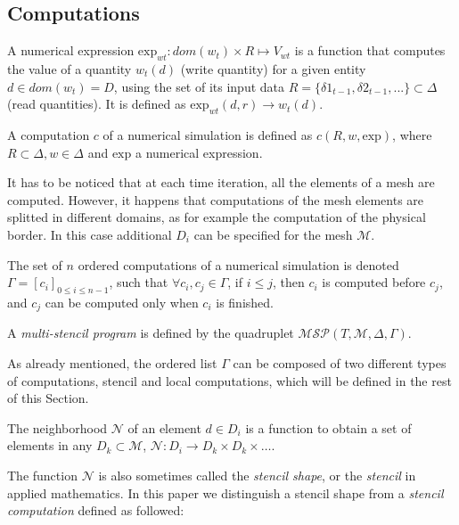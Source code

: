 \subsection{Computations}

\begin{mydef}
A numerical expression $\text{exp}_{wt}: dom(w_t)\times R\mapsto V_{wt}$ is a function that computes the value of a quantity $w_t(d)$ (write quantity) for a given entity $d \in dom(w_t)=D$, using the set of its input data $R=\{\delta 1_{t-1}, \delta 2_{t-1}, ...\} \subset \Delta$ (read quantities). It is defined as $\text{exp}_{wt}(d,r) \rightarrow w_t(d)$.
\end{mydef}


\begin{mydef}
A computation $c$ of a numerical simulation is defined as $c(R,w,\text{exp})$, where $R \subset \Delta, w \in \Delta$ and $\text{exp}$ a numerical expression. %
\end{mydef}
It has to be noticed that at each time iteration, all the elements of a mesh are computed. However, it happens that computations of the mesh elements are splitted in different domains, as for example the computation of the physical border. In this case additional $D_i$ can be specified for the mesh $\mathcal{M}$.

\begin{mydef}
The set of $n$ ordered computations of a numerical simulation is denoted $\Gamma = [c_i]_{0 \leq i \leq n-1}$, such that $\forall c_i,c_j \in \Gamma$, if $i \leq j$, then $c_i$ is computed before $c_j$, and $c_j$ can be computed only when $c_i$ is finished.
\end{mydef}

\begin{mydef}
A \textit{multi-stencil program} is defined by the quadruplet $\mathcal{MSP}(T,\mathcal{M},\Delta,\Gamma)$.
\end{mydef}

As already mentioned, the ordered list $\Gamma$ can be composed of two different types of computations, stencil and local computations, which will be defined in the rest of this Section.

\begin{mydef}
The neighborhood $\mathcal{N}$ of an element $d \in D_i$ is a function to obtain a set of elements in any $D_k \subset \mathcal{M}$, $\mathcal{N} : D_i \rightarrow D_k \times D_k \times \dots$.
\end{mydef}
The function $\mathcal{N}$ is also sometimes called the \textit{stencil shape}, or the \textit{stencil} in applied mathematics. In this paper we distinguish a stencil shape from a \textit{stencil computation} defined as followed:

